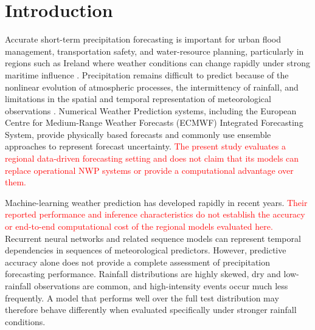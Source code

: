 \section{Introduction}
\label{intro}

Accurate short-term precipitation forecasting is important for urban flood management, transportation safety, and water-resource planning, particularly in regions such as Ireland where weather conditions can change rapidly under strong maritime influence \citep{toth2000comparison}. Precipitation remains difficult to predict because of the nonlinear evolution of atmospheric processes, the intermittency of rainfall, and limitations in the spatial and temporal representation of meteorological observations \citep{magnusson2019ecmwf}. Numerical Weather Prediction systems, including the European Centre for Medium-Range Weather Forecasts (ECMWF) Integrated Forecasting System, provide physically based forecasts and commonly use ensemble approaches to represent forecast uncertainty. \textcolor{red}{The present study evaluates a regional data-driven forecasting setting and does not claim that its models can replace operational NWP systems or provide a computational advantage over them.}

Machine-learning weather prediction has developed rapidly in recent years.  \textcolor{red}{Their reported performance and inference characteristics do not establish the accuracy or end-to-end computational cost of the regional models evaluated here.} Recurrent neural networks and related sequence models can represent temporal dependencies in sequences of meteorological predictors. However, predictive accuracy alone does not provide a complete assessment of precipitation forecasting performance. Rainfall distributions are highly skewed, dry and low-rainfall observations are common, and high-intensity events occur much less frequently. A model that performs well over the full test distribution may therefore behave differently when evaluated specifically under stronger rainfall conditions.

